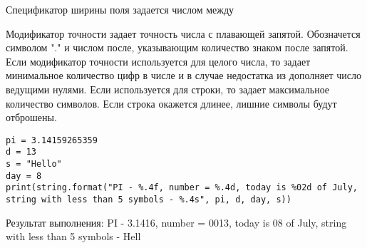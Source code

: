 \begin{enumerate}
Спецификатор ширины поля задается числом между %

Модификатор точности задает точность числа с плавающей запятой. Обозначется символом "." и числом после, указывающим количество знаком после запятой. Если модификатор точности используется для целого числа, то задает минимальное количество цифр в числе и в случае недостатка из дополняет число ведущими нулями. Если используется для строки, то задает максимальное количество символов. Если строка окажется длинее, лишние символы будут отброшены. 

\begin{lstlisting}
pi = 3.14159265359
d = 13
s = "Hello"
day = 8
print(string.format("PI - %.4f, number = %.4d, today is %02d of July, string with less than 5 symbols - %.4s", pi, d, day, s))
\end{lstlisting} 

Результат выполнения:
PI - 3.1416, number = 0013, today is 08 of July, string with less than 5 symbols - Hell

\end{enumerate} 